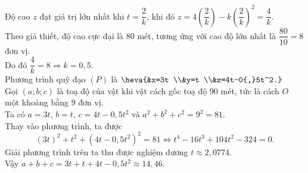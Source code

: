 \begin{ex}
{		Độ cao $z$ đạt giá trị lớn nhất khi $t=\dfrac{2}{k}$, khi đó $z = 4\left(\dfrac{2}{k}\right) - k\left(\dfrac{2}{k}\right)^2 = \dfrac{4}{k}$.\\
		Theo giả thiết, độ cao cực đại là $80$ mét, tương ứng với cao độ lớn nhất là $\dfrac{80}{10} = 8$ đơn vị.\\
		Do đó $\dfrac{4}{k} = 8 \Rightarrow k = 0{,}5$.\\
		Phương trình quỹ đạo $(P)$ là $\heva{&x=3t \\&y=t \\&z=4t-0{,}5t^2.}$\\
		Gọi $(a;b;c)$ là toạ độ của vật khi vật cách gốc toạ độ $90$ mét, tức là cách $O$ một khoảng bằng $9$ đơn vị.\\
		Ta có $a=3t$, $b=t$, $c=4t-0{,}5t^2$ và $a^2+b^2+c^2=9^2=81$.\\
		Thay vào phương trình, ta được
		\[(3t)^2 + t^2 + \left(4t-0{,}5t^2\right)^2 = 81 \Leftrightarrow t^4 - 16t^3 + 104t^2 - 324 = 0.\]
		Giải phương trình trên ta thu được nghiệm dương $t \approx 2{,}0774$.\\
		Vậy $a+b+c = 3t + t + 4t - 0{,}5t^2\approx 14{,}46$.
	}
\end{ex}

